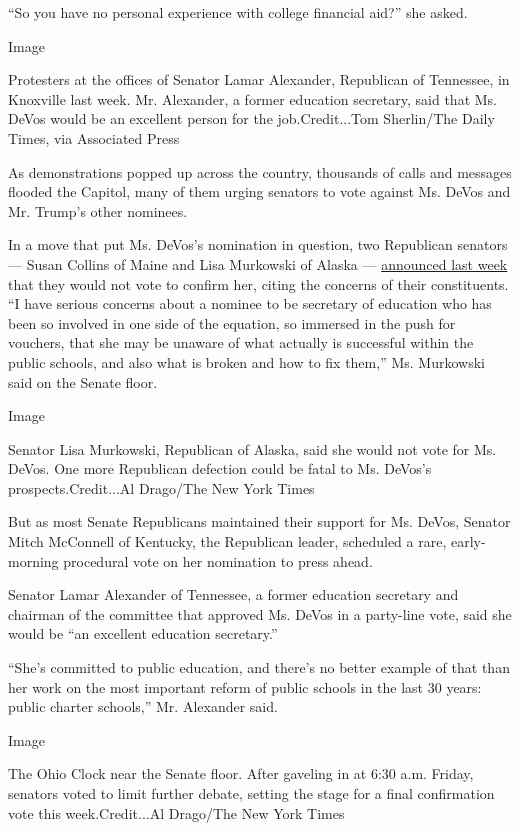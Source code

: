 ``So you have no personal experience with college financial aid?'' she
asked.

Image

Protesters at the offices of Senator Lamar Alexander, Republican of
Tennessee, in Knoxville last week. Mr. Alexander, a former education
secretary, said that Ms. DeVos would be an excellent person for the
job.Credit...Tom Sherlin/The Daily Times, via Associated Press

As demonstrations popped up across the country, thousands of calls and
messages flooded the Capitol, many of them urging senators to vote
against Ms. DeVos and Mr. Trump's other nominees.

In a move that put Ms. DeVos's nomination in question, two Republican
senators --- Susan Collins of Maine and Lisa Murkowski of Alaska ---
\href{https://www.nytimes.com/2017/02/01/us/politics/trump-cabinet-nominations-senate.html}{announced
last week} that they would not vote to confirm her, citing the concerns
of their constituents. ``I have serious concerns about a nominee to be
secretary of education who has been so involved in one side of the
equation, so immersed in the push for vouchers, that she may be unaware
of what actually is successful within the public schools, and also what
is broken and how to fix them,'' Ms. Murkowski said on the Senate floor.

Image

Senator Lisa Murkowski, Republican of Alaska, said she would not vote
for Ms. DeVos. One more Republican defection could be fatal to Ms.
DeVos's prospects.Credit...Al Drago/The New York Times

But as most Senate Republicans maintained their support for Ms. DeVos,
Senator Mitch McConnell of Kentucky, the Republican leader, scheduled a
rare, early-morning procedural vote on her nomination to press ahead.

Senator Lamar Alexander of Tennessee, a former education secretary and
chairman of the committee that approved Ms. DeVos in a party-line vote,
said she would be ``an excellent education secretary.''

``She's committed to public education, and there's no better example of
that than her work on the most important reform of public schools in the
last 30 years: public charter schools,'' Mr. Alexander said.

Image

The Ohio Clock near the Senate floor. After gaveling in at 6:30 a.m.
Friday, senators voted to limit further debate, setting the stage for a
final confirmation vote this week.Credit...Al Drago/The New York Times

